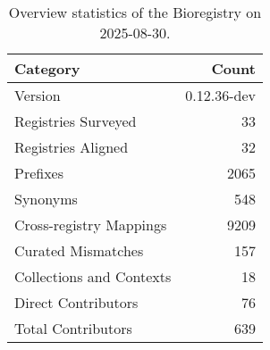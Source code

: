 \begin{table}
\caption{Overview statistics of the Bioregistry on 2025-08-30.}
\label{tab:bioregistry-summary}
\begin{tabular}{lr}
\toprule
Category & Count \\
\midrule
Version & 0.12.36-dev \\
Registries Surveyed & 33 \\
Registries Aligned & 32 \\
Prefixes & 2065 \\
Synonyms & 548 \\
Cross-registry Mappings & 9209 \\
Curated Mismatches & 157 \\
Collections and Contexts & 18 \\
Direct Contributors & 76 \\
Total Contributors & 639 \\
\bottomrule
\end{tabular}
\end{table}
